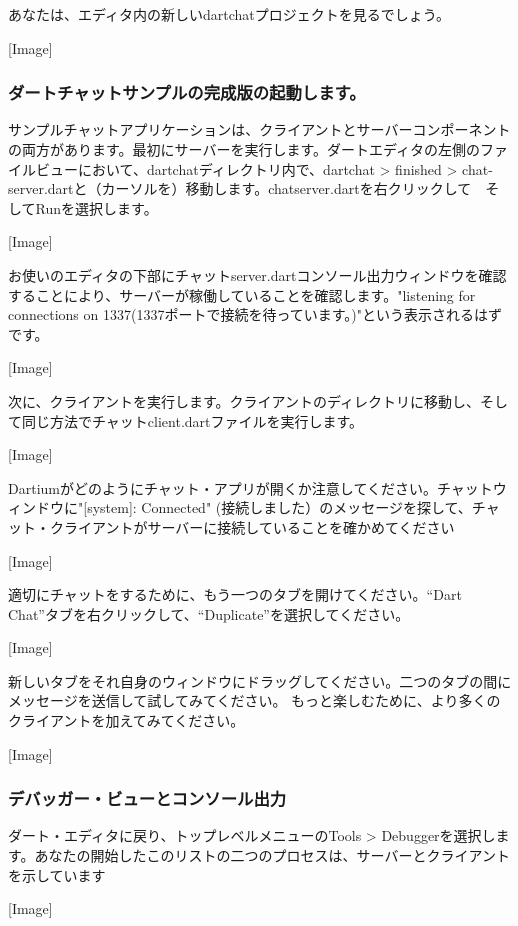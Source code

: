あなたは、エディタ内の新しいdartchatプロジェクトを見るでしょう。

[Image]

\subsubsection{ダートチャットサンプルの完成版の起動します。}

サンプルチャットアプリケーションは、クライアントとサーバーコンポーネントの両方があります。最初にサーバーを実行します。ダートエディタの左側のファイルビューにおいて、dartchatディレクトリ内で、dartchat > finished > chat-server.dartと（カーソルを）移動します。chatserver.dartを右クリックして　そしてRunを選択します。

[Image]

お使いのエディタの下部にチャットserver.dartコンソール出力ウィンドウを確認することにより、サーバーが稼働していることを確認します。"listening for connections on 1337(1337ポートで接続を待っています。)"という表示されるはずです。

[Image]

次に、クライアントを実行します。クライアントのディレクトリに移動し、そして同じ方法でチャットclient.dartファイルを実行します。

[Image]

Dartiumがどのようにチャット・アプリが開くか注意してください。チャットウィンドウに"[system]: Connected" (接続しました）のメッセージを探して、チャット・クライアントがサーバーに接続していることを確かめてください

[Image]

適切にチャットをするために、もう一つのタブを開けてください。“Dart Chat”タブを右クリックして、“Duplicate”を選択してください。

[Image]

新しいタブをそれ自身のウィンドウにドラッグしてください。二つのタブの間にメッセージを送信して試してみてください。
もっと楽しむために、より多くのクライアントを加えてみてください。

[Image]

\subsubsection{デバッガー・ビューとコンソール出力}

ダート・エディタに戻り、トップレベルメニューのTools > Debuggerを選択します。あなたの開始したこのリストの二つのプロセスは、サーバーとクライアントを示しています

[Image]

